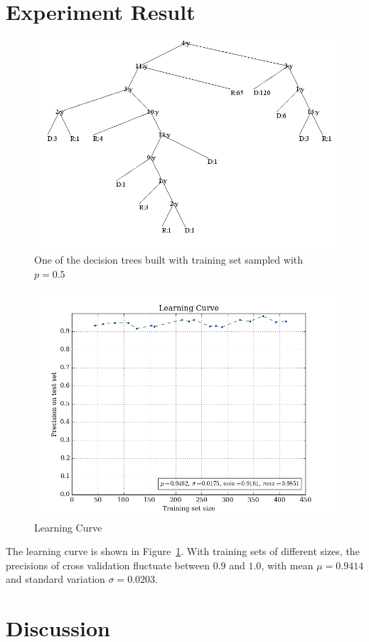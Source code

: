 \documentclass{article}
\begin{document}
\section{Experiment Result}


\begin{figure}[H]
\centering
\includegraphics[width=400pt]{../asset/tree.png}
\caption{One of the decision trees built with training set sampled with $p = 0.5$}
\end{figure}

\begin{figure}[H]
\centering
\includegraphics[width=400pt]{../asset/learning-curve.png}
\caption{Learning Curve}
\label{fig:curve}
\end{figure}

The learning curve is shown in Figure~\ref{fig:curve}. With training sets of different sizes, the precisions of cross validation fluctuate between $0.9$ and $1.0$, with mean $\mu = 0.9414$ and standard variation $\sigma = 0.0203$.

\section{Discussion}




\end{document}
